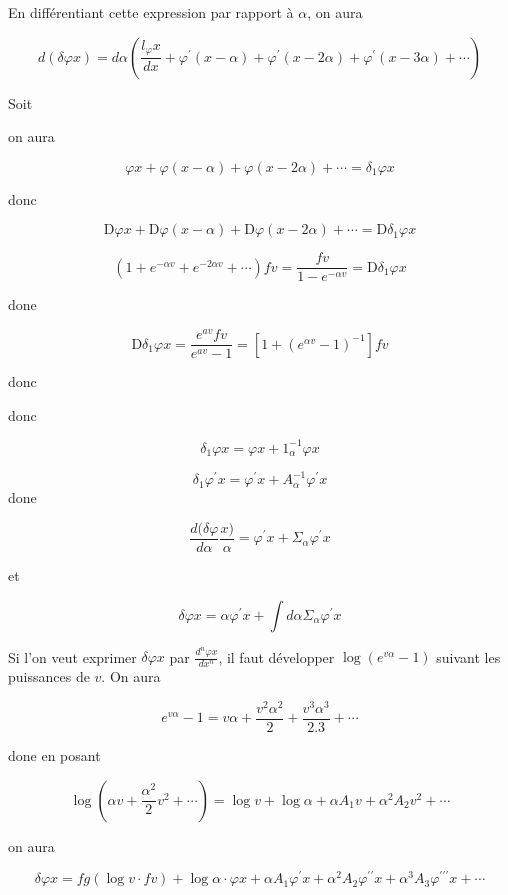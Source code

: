 \documentclass{article}
\begin{document}
En différentiant cette expression par rapport à \(\alpha\), on aura

\[
d(\delta \varphi x)=d \alpha\left(\frac{l_{\varphi} x}{d x}+\varphi^{\prime}(x-\alpha)+\varphi^{\prime}(x-2 \alpha)+\varphi^{\prime}(x-3 \alpha)+\cdots\right)
\]

Soit

on aura

\[
\varphi x+\varphi(x-\alpha)+\varphi(x-2 \alpha)+\cdots=\delta_{1} \varphi x
\]

donc

\[
\mathrm{D} \varphi x+\mathrm{D} \varphi(x-\alpha)+\mathrm{D} \varphi(x-2 \alpha)+\cdots=\mathrm{D} \delta_{1} \varphi x
\]

\[
\left(1+e^{-\alpha v}+e^{-2 \alpha v}+\cdots\right) f v=\frac{f v}{1-e^{-\alpha v}}=\mathrm{D} \delta_{1} \varphi x
\]

done

\[
\mathrm{D} \delta_{1} \varphi x=\frac{e^{a v} f v}{e^{a v}-1}=\left[1+\left(e^{\alpha v}-1\right)^{-1}\right] f v
\]

donc

donc

\[
\delta_{1} \varphi x=\varphi x+\mathcal{1}_{\alpha}^{-1} \varphi x
\]

\[
\delta_{1} \varphi^{\prime} x=\varphi^{\prime} x+A_{\alpha}^{-1} \varphi^{\prime} x
\]
done

\[
\frac{d(\delta \varphi}{d \alpha} \frac{x)}{\alpha}=\varphi^{\prime} x+\Sigma_{\alpha} \varphi^{\prime} x
\]

et

\[
\delta \varphi x=\alpha \varphi^{\prime} x+\int d \alpha \Sigma_{\alpha} \varphi^{\prime} x
\]

Si l'on veut exprimer \(\delta \varphi x\) par \(\frac{d^{n} \varphi x}{d x^{n}}\), il faut développer \(\log \left(e^{v \alpha}-1\right)\) suivant les puissances de \(v\). On aura

\[
e^{v \alpha}-1=v \alpha+\frac{v^{2} \alpha^{2}}{2}+\frac{v^{3} \alpha^{3}}{2.3}+\cdots
\]

done en posant

\[
\log \left(\alpha v+\frac{\alpha^{2}}{2} v^{2}+\cdots\right)=\log v+\log \alpha+\alpha A_{1} v+\alpha^{2} A_{2} v^{2}+\cdots
\]

on aura

\[
\delta \varphi x=f g(\log v \cdot f v)+\log \alpha \cdot \varphi x+\alpha A_{1} \varphi^{\prime} x+\alpha^{2} A_{2} \varphi^{\prime \prime} x+\alpha^{3} A_{3} \varphi^{\prime \prime \prime} x+\cdots
\]
\end{document}
